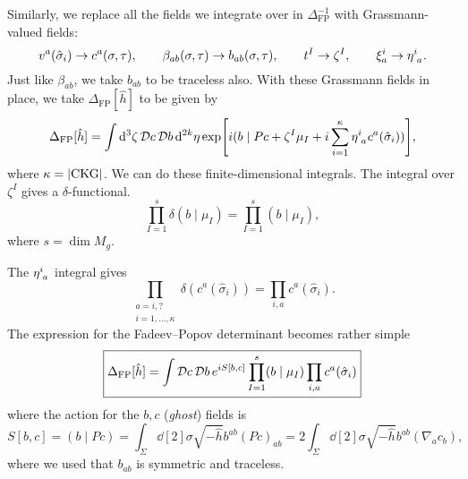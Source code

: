 Similarly, we replace all the fields we integrate over in $\Delta_{\text{FP}}^{-1}$ with Grassmann-valued fields:
\begin{equation}
  v^a(\hat{\sigma}_i) \to c^a(\sigma, \tau), \qquad 
  \beta_{ab}(\sigma, \tau) \to b_{ab}(\sigma, \tau), \qquad
  t^I \to \zeta^I, \qquad
  \xi^i_a \to \eta\indices{^{i}_{a}}.
\end{equation}
Just like $\beta_{ab}$, we take $b_{ab}$ to be traceless also.
With these Grassmann fields in place, we take $\Delta_{\text{FP}}[\hat{h}]$ to be given by
\begin{equation}
  \Delta_{\text{FP}}[\hat{h}] = \int \dd[3]{\zeta} \pdd{c} \pdd{b} \dd[2k]{\eta} \exp[i (b \mid Pc + \zeta^I \mu_I + i \sum_{i=1}^{\kappa} \eta\indices{^{i}_{a}} c^a(\hat{\sigma}_i))],
\end{equation}
where $\kappa = \abs{\text{CKG}}$.
We can do these finite-dimensional integrals.
The integral over $\zeta^I$ gives a $\delta$-functional.
\begin{equation}
  \prod_{I =1}^s \delta(b \mid \mu_I) = \prod_{I = 1}^s (b \mid \mu_I),
\end{equation}
where $s = \dim M_g$.

The $\eta\indices{^{i}_{a}}$  integral gives
\begin{equation}
  \prod_{\substack{a= i, ? \\i = 1, \dots, \kappa}} \delta(c^a(\hat{\sigma}_i))  = \prod_{i, a} c^a(\hat{\sigma}_i).
\end{equation}
The expression for the Fadeev--Popov determinant becomes rather simple
\begin{equation}
  \boxed{\Delta_{\text{FP}}[\hat{h}] = \int \mathop{\mathcal{D} c} \mathop{\mathcal{D} b} e^{i S[b, c]} \prod_{I = 1}^s (b \mid \mu_I) \prod_{i, a} c^a (\hat{\sigma}_i)}
\end{equation}
where the action for the $b, c$  (\emph{ghost}) fields is
\begin{equation}
  S[b, c] = (b \mid Pc) = \int_\Sigma \dd[2]{\sigma} \sqrt{-\hat{h}} b^{ab} (Pc)_{ab} = 2 \int_\Sigma \dd[2]{\sigma} \sqrt{-\hat{h}} b^{ab} (\nabla_a c_b),
\end{equation}
where we used that $b_{ab}$ is symmetric and traceless.
